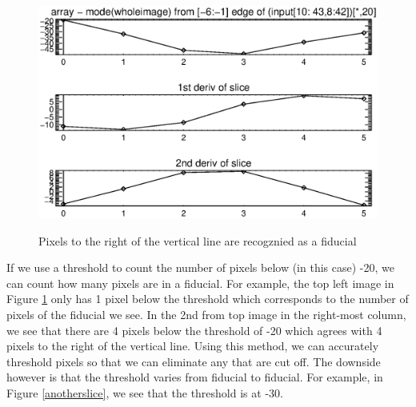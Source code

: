 \documentclass[10pt]{article}
\begin{document}
\begin{figure}[!ht]
{        \includegraphics[width=0.5\linewidth, height = .34\textheight, keepaspectratio=true]{../plots_tables_images/betterslice5.eps}
        }
        \caption{Pixels to the right of the vertical line are recogznied as a fiducial}
        \label{betterslice}
\end{figure}

If we use a threshold to count the number of pixels below (in this case) -20, we can count how many pixels are in a fiducial. For example, the top left image in Figure \ref{betterslice} only has 1 pixel below the threshold which corresponds to the number of pixels of the fiducial we see. In the 2nd from top image in the right-most column, we see that there are 4 pixels below the threshold of -20 which agrees with 4 pixels to the right of the vertical line. Using this method, we can accurately threshold pixels so that we can eliminate any that are cut off. The downside however is that the threshold varies from fiducial to fiducial. For example, in Figure \ref{anotherslice}, we see that the threshold is at -30.
\end{document}
